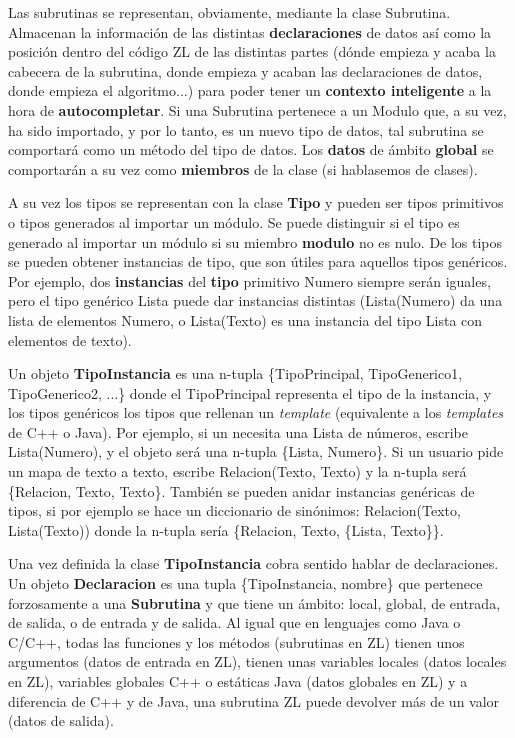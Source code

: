 \documentclass{report}
\begin{document}
	\vspace{10px}
	
	Las subrutinas se representan, obviamente, mediante la clase Subrutina. Almacenan la información de las distintas \textbf{declaraciones} de datos así como la posición dentro del código ZL de las distintas partes (dónde empieza y acaba la cabecera de la subrutina, donde empieza y acaban las declaraciones de datos, donde empieza el algoritmo...) para poder tener un \textbf{contexto inteligente} a la hora de \textbf{autocompletar}. Si una Subrutina pertenece a un Modulo que, a su vez, ha sido importado, y por lo tanto, es un nuevo tipo de datos, tal subrutina se comportará como un método del tipo de datos. Los \textbf{datos} de ámbito \textbf{global} se comportarán a su vez como \textbf{miembros} de la clase (si hablasemos de clases). 
	
	\vspace{10px}
	
	A su vez los tipos se representan con la clase \textbf{Tipo} y pueden ser tipos primitivos o tipos generados al importar un módulo. Se puede distinguir si el tipo es generado al importar un módulo si su miembro \textbf{modulo} no es nulo. De los tipos se pueden obtener instancias de tipo, que son útiles para aquellos tipos genéricos. Por ejemplo, dos \textbf{instancias} del \textbf{tipo} primitivo Numero siempre serán iguales, pero el tipo genérico Lista puede dar instancias distintas (Lista(Numero) da una lista de elementos Numero, o Lista(Texto) es una instancia del tipo Lista con elementos de texto). 
	
	\vspace{10px}
	
	Un objeto \textbf{TipoInstancia} es una n-tupla \{TipoPrincipal, TipoGenerico1, TipoGenerico2, ...\} donde el TipoPrincipal representa el tipo de la instancia, y los tipos genéricos los tipos que rellenan un \textit{template} (equivalente a los \textit{templates} de C++ o Java). Por ejemplo, si un necesita una Lista de números, escribe Lista(Numero), y el objeto será una n-tupla \{Lista, Numero\}. Si un usuario pide un mapa de texto a texto, escribe Relacion(Texto, Texto) y la n-tupla será \{Relacion, Texto, Texto\}. También se pueden anidar instancias genéricas de tipos, si por ejemplo se hace un diccionario de sinónimos: Relacion(Texto, Lista(Texto)) donde la n-tupla sería \{Relacion, Texto, \{Lista, Texto\}\}.
	
	\vspace{10px}
	
	Una vez definida la clase \textbf{TipoInstancia} cobra sentido hablar de declaraciones. Un objeto \textbf{Declaracion} es una tupla \{TipoInstancia, nombre\} que pertenece forzosamente a una \textbf{Subrutina} y que tiene un ámbito: local, global, de entrada, de salida, o de entrada y de salida. Al igual que en lenguajes como Java o C/C++, todas las funciones y los métodos (subrutinas en ZL) tienen unos argumentos (datos de entrada en ZL), tienen unas variables locales (datos locales en ZL), variables globales C++ o estáticas Java (datos globales en ZL) y a diferencia de C++ y de Java, una subrutina ZL puede devolver más de un valor (datos de salida).
	
\end{document}

